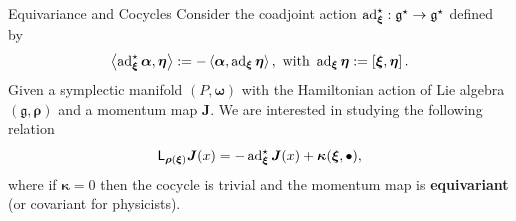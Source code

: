 \documentclass{beamer}
\begin{document}
\begin{frame}{}
  \begin{block}{Equivariance and Cocycles}
    Consider the coadjoint action \(\operatorname{ad} ^{\star} _{\boldsymbol{\xi}} : \mathfrak{g} ^{\star} \to \mathfrak{g} ^{\star}\) defined by
    \begin{equation}
      \left< \operatorname{ad} ^{\star} _{\boldsymbol{\xi}} \boldsymbol{\alpha}, \boldsymbol{\eta} \right> := - \left< \boldsymbol{\alpha}, \operatorname{ad} _{\boldsymbol{\xi}} \boldsymbol{\eta}\right>, \text{ with } \operatorname{ad} _{\boldsymbol{\xi}} \boldsymbol{\eta} := \left[ \boldsymbol{\xi}, \boldsymbol{\eta} \right].
    \end{equation}
    Given a symplectic manifold \((P, \boldsymbol{\omega})\) with the Hamiltonian action of Lie algebra \((\mathfrak{g}, \boldsymbol{\rho})\) and a momentum map \(\boldsymbol{J}\). We are interested in studying the following relation
    \begin{equation}
    \mathsf{L}_ {\boldsymbol{\rho} (\boldsymbol{\xi})} \boldsymbol{J} (x) = - \operatorname{ad} ^{\star} _{\boldsymbol{\xi}} \boldsymbol{J} (x) + \boldsymbol{\kappa} (\boldsymbol{\xi}, \bullet),
    \end{equation}
    where if \(\boldsymbol{\kappa} = 0\) then the cocycle is trivial and the momentum map is \textbf{equivariant} (or covariant for physicists).
  \end{block}
\end{frame}

\end{document}
